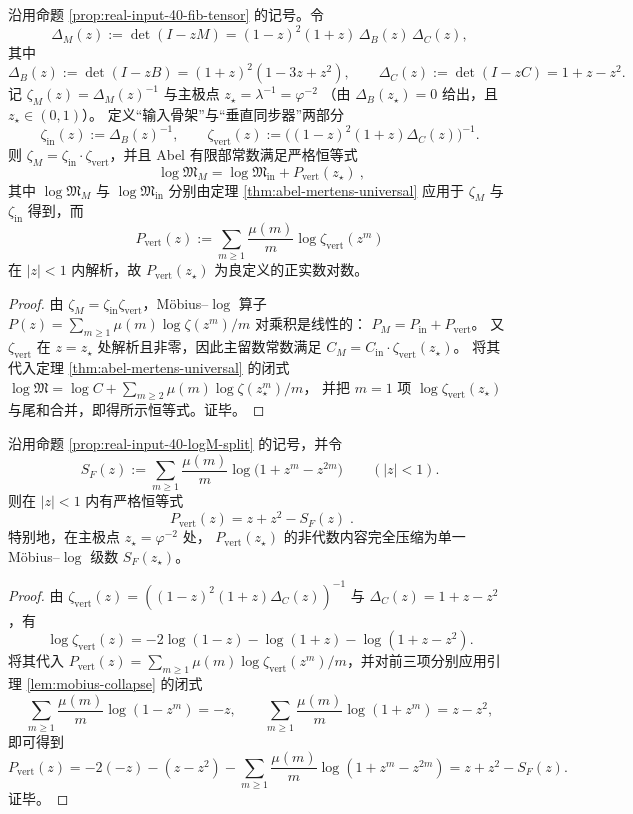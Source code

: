 \begin{proposition}\label{prop:real-input-40-logM-split}
沿用命题 \ref{prop:real-input-40-fib-tensor} 的记号。令
\[
\Delta_M(z):=\det(I-zM)=(1-z)^2(1+z)\,\Delta_B(z)\,\Delta_C(z),
\]
其中
\[
\Delta_B(z):=\det(I-zB)=(1+z)^2(1-3z+z^2),
\qquad
\Delta_C(z):=\det(I-zC)=1+z-z^2.
\]
记
\(
\zeta_M(z)=\Delta_M(z)^{-1}
\)
与主极点
\(
z_\star=\lambda^{-1}=\varphi^{-2}
\)
（由 $\Delta_B(z_\star)=0$ 给出，且 $z_\star\in(0,1)$）。
定义“输入骨架”与“垂直同步器”两部分
\[
\zeta_{\mathrm{in}}(z):=\Delta_B(z)^{-1},
\qquad
\zeta_{\mathrm{vert}}(z):=\bigl((1-z)^2(1+z)\Delta_C(z)\bigr)^{-1}.
\]
则 $\zeta_M=\zeta_{\mathrm{in}}\cdot \zeta_{\mathrm{vert}}$，并且 Abel 有限部常数满足严格恒等式
\[
\boxed{\ \log\mathfrak{M}_M=\log\mathfrak{M}_{\mathrm{in}}+P_{\mathrm{vert}}(z_\star)\ },
\]
其中 $\log\mathfrak{M}_M$ 与 $\log\mathfrak{M}_{\mathrm{in}}$ 分别由定理 \ref{thm:abel-mertens-universal} 应用于 $\zeta_M$ 与 $\zeta_{\mathrm{in}}$ 得到，而
\[
P_{\mathrm{vert}}(z):=\sum_{m\ge 1}\frac{\mu(m)}{m}\log \zeta_{\mathrm{vert}}(z^m)
\]
在 $|z|<1$ 内解析，故 $P_{\mathrm{vert}}(z_\star)$ 为良定义的正实数对数。
\end{proposition}
\begin{proof}
由 $\zeta_M=\zeta_{\mathrm{in}}\zeta_{\mathrm{vert}}$，Möbius--$\log$ 算子 $P(z)=\sum_{m\ge 1}\mu(m)\log\zeta(z^m)/m$ 对乘积是线性的：
\(
P_M=P_{\mathrm{in}}+P_{\mathrm{vert}}
\)。
又 $\zeta_{\mathrm{vert}}$ 在 $z=z_\star$ 处解析且非零，因此主留数常数满足
\(
C_M=C_{\mathrm{in}}\cdot \zeta_{\mathrm{vert}}(z_\star)
\)。
将其代入定理 \ref{thm:abel-mertens-universal} 的闭式
\(
\log\mathfrak{M}=\log C+\sum_{m\ge 2}\mu(m)\log\zeta(z_\star^m)/m
\)，
并把 $m=1$ 项 $\log\zeta_{\mathrm{vert}}(z_\star)$ 与尾和合并，即得所示恒等式。证毕。
\end{proof}

\begin{corollary}\label{cor:real-input-40-vert-single-series}
沿用命题 \ref{prop:real-input-40-logM-split} 的记号，并令
\[
S_F(z):=\sum_{m\ge 1}\frac{\mu(m)}{m}\log\bigl(1+z^m-z^{2m}\bigr)\qquad(|z|<1).
\]
则在 \(|z|<1\) 内有严格恒等式
\[
\boxed{\;
P_{\mathrm{vert}}(z)=z+z^2-S_F(z)\; }.
\]
特别地，在主极点 \(z_\star=\varphi^{-2}\) 处，
\(
P_{\mathrm{vert}}(z_\star)
\)
的非代数内容完全压缩为单一 Möbius--$\log$ 级数 \(S_F(z_\star)\)。
\end{corollary}
\begin{proof}
由 \(\zeta_{\mathrm{vert}}(z)=((1-z)^2(1+z)\Delta_C(z))^{-1}\) 与 \(\Delta_C(z)=1+z-z^2\)，有
\[
\log \zeta_{\mathrm{vert}}(z)
=-2\log(1-z)-\log(1+z)-\log(1+z-z^2).
\]
将其代入
\(
P_{\mathrm{vert}}(z)=\sum_{m\ge 1}\mu(m)\log\zeta_{\mathrm{vert}}(z^m)/m
\)，并对前三项分别应用引理 \ref{lem:mobius-collapse} 的闭式
\[
\sum_{m\ge 1}\frac{\mu(m)}{m}\log(1-z^m)=-z,\qquad
\sum_{m\ge 1}\frac{\mu(m)}{m}\log(1+z^m)=z-z^2,
\]
即可得到
\[
P_{\mathrm{vert}}(z)
=-2(-z)-(z-z^2)-\sum_{m\ge 1}\frac{\mu(m)}{m}\log(1+z^m-z^{2m})
=z+z^2-S_F(z).
\]
证毕。
\end{proof}

